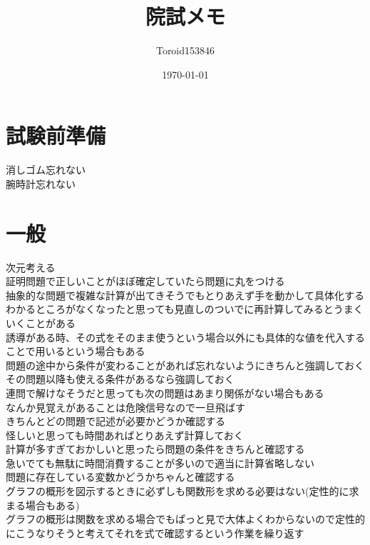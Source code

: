 \documentclass{ltjsarticle}
\title{院試メモ}
\author{Toroid153846}
\date{\today}
\begin{document}
\maketitle
  \section{試験前準備}
  消しゴム忘れない\\
  腕時計忘れない
  \section{一般}
  次元考える\\
  証明問題で正しいことがほぼ確定していたら問題に丸をつける\\
  抽象的な問題で複雑な計算が出てきそうでもとりあえず手を動かして具体化する\\
  わかるところがなくなったと思っても見直しのついでに再計算してみるとうまくいくことがある\\
  誘導がある時、その式をそのまま使うという場合以外にも具体的な値を代入することで用いるという場合もある\\
  問題の途中から条件が変わることがあれば忘れないようにきちんと強調しておく\\
  その問題以降も使える条件があるなら強調しておく\\
  連問で解けなそうだと思っても次の問題はあまり関係がない場合もある\\
  なんか見覚えがあることは危険信号なので一旦飛ばす\\
  きちんとどの問題で記述が必要かどうか確認する\\
  怪しいと思っても時間あればとりあえず計算しておく\\
  計算が多すぎておかしいと思ったら問題の条件をきちんと確認する\\
  急いでても無駄に時間消費することが多いので適当に計算省略しない\\
  問題に存在している変数かどうかちゃんと確認する\\
  グラフの概形を図示するときに必ずしも関数形を求める必要はない(定性的に求まる場合もある)\\
  グラフの概形は関数を求める場合でもぱっと見で大体よくわからないので定性的にこうなりそうと考えてそれを式で確認するという作業を繰り返す\\
\end{document}
